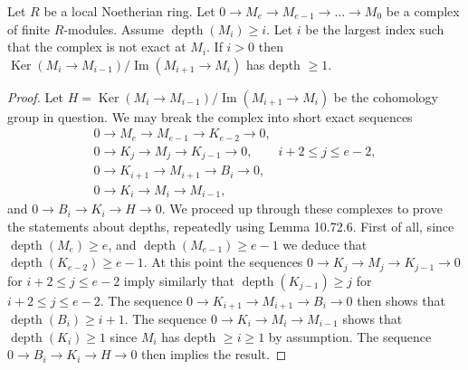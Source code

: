 \begin{lemma}
Let $R$ be a local Noetherian ring. Let $0\to M_e\to M_{e-1}\to\ldots\to M_0$ be a complex of finite $R$-modules. Assume $\operatorname{depth}(M_i)\geq i$. Let $i$ be the largest index such that the complex is not exact at $M_i$. If $i>0$ then $\operatorname{Ker}(M_i\to M_{i-1})/\operatorname{Im}(M_{i+1}\to M_i)$ has depth $\geq1$.
\end{lemma}
\begin{proof}
Let $H=\operatorname{Ker}(M_i\to M_{i-1})/\operatorname{Im}(M_{i+1}\to M_i)$ be the cohomology group in question. We may break the complex into short exact sequences
\[
\begin{gathered}
0\to M_e\to M_{e-1}\to K_{e-2}\to0,\\
0\to K_j\to M_j\to K_{j-1}\to0,\qquad i+2\leq j\leq e-2,\\
0\to K_{i+1}\to M_{i+1}\to B_i\to0,\\
0\to K_i\to M_i\to M_{i-1},
\end{gathered}
\]
and $0\to B_i\to K_i\to H\to0$. We proceed up through these complexes to prove the statements about depths, repeatedly using Lemma 10.72.6. First of all, since $\operatorname{depth}(M_e)\geq e$, and $\operatorname{depth}(M_{e-1})\geq e-1$ we deduce that $\operatorname{depth}(K_{e-2})\geq e-1$. At this point the sequences $0\to K_j\to M_j\to K_{j-1}\to0$ for $i+2\leq j\leq e-2$ imply similarly that $\operatorname{depth}(K_{j-1})\geq j$ for $i+2\leq j\leq e-2$. The sequence $0\to K_{i+1}\to M_{i+1}\to B_i\to0$ then shows that $\operatorname{depth}(B_i)\geq i+1$. The sequence $0\to K_i\to M_i\to M_{i-1}$ shows that $\operatorname{depth}(K_i)\geq1$ since $M_i$ has depth $\geq i\geq1$ by assumption. The sequence $0\to B_i\to K_i\to H\to0$ then implies the result.
\end{proof}

